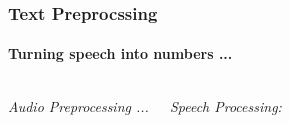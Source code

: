 \documentclass[10pt,usepdftitle=false,aspectratio=169]{beamer}
\begin{document}
\begin{frame}\frametitle{Text Preprocssing}
    \framesubtitle{Turning speech into numbers ...}
	\begin{columns}
	
	
	
		\emph{Audio Preprocessing ...}
		
	
		
		
		
		
		
	
		\emph{Speech Processing:}
		
		
		
	
		\end{columns}
	\end{frame}




	
	

	

	
\end{document}
